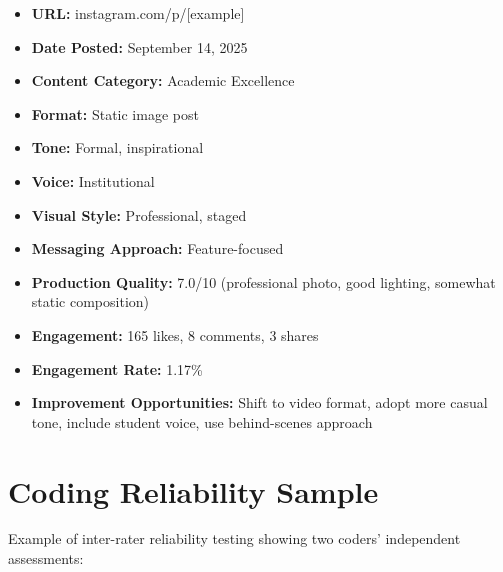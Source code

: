 \documentclass[12pt]{report}
\begin{document}
\begin{itemize}
\item \textbf{URL:} instagram.com/p/[example]
\item \textbf{Date Posted:} September 14, 2025
\item \textbf{Content Category:} Academic Excellence
\item \textbf{Format:} Static image post
\item \textbf{Tone:} Formal, inspirational
\item \textbf{Voice:} Institutional
\item \textbf{Visual Style:} Professional, staged
\item \textbf{Messaging Approach:} Feature-focused
\item \textbf{Production Quality:} 7.0/10 (professional photo, good lighting, somewhat static composition)
\item \textbf{Engagement:} 165 likes, 8 comments, 3 shares
\item \textbf{Engagement Rate:} 1.17\%
\item \textbf{Improvement Opportunities:} Shift to video format, adopt more casual tone, include student voice, use behind-scenes approach
\end{itemize}

\section{Coding Reliability Sample}

Example of inter-rater reliability testing showing two coders' independent assessments:
\end{document}
